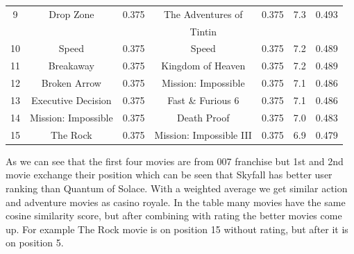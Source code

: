 \begin{table}[ht]
\begin{tabular}{c|cc|cccc}
	9        & Drop Zone            & 0.375  & The Adventures of       & 0.375  & 7.3    & 0.493    \\
	         &                      &        & Tintin                  &        &        &          \\
	10       & Speed                & 0.375  & Speed                   & 0.375  & 7.2    & 0.489    \\
	11       & Breakaway            & 0.375  & Kingdom of Heaven       & 0.375  & 7.2    & 0.489    \\
	12       & Broken Arrow         & 0.375  & Mission: Impossible     & 0.375  & 7.1    & 0.486    \\
	13       & Executive Decision   & 0.375  & Fast \& Furious 6       & 0.375  & 7.1    & 0.486    \\
	14       & Mission: Impossible  & 0.375  & Death Proof             & 0.375  & 7.0    & 0.483    \\
	15       & The Rock             & 0.375  & Mission: Impossible III & 0.375  & 6.9    & 0.479    \\
	\bottomrule
	\end{tabular}	
 	\label{tab:comparison}
\end{table}

As we can see that the first four movies are from 007 franchise but 1st and 2nd movie exchange their position which can be seen that Skyfall has better user ranking than Quantum of Solace. With a weighted average we get similar action and adventure movies as casino royale. In the table many movies have the same cosine similarity score, but after combining with rating the better movies come up. For example The Rock movie is on position 15 without rating, but after it is on position 5.





